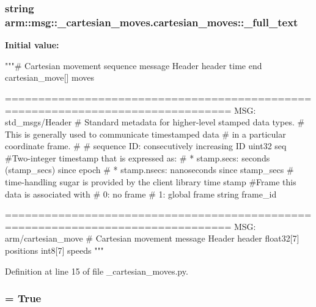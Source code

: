 \subsubsection[{\-\_\-full\-\_\-text}]{\setlength{\rightskip}{0pt plus 5cm}string {\bf arm\-::msg\-::\-\_\-cartesian\-\_\-moves.\-cartesian\-\_\-moves\-::\-\_\-full\-\_\-text}\hspace{0.3cm}{\ttfamily  [static, private]}}\label{classarm_1_1msg_1_1__cartesian__moves_1_1cartesian__moves_a37d112c5bd835b8555970e9e96efc03d}
{\bfseries \-Initial value\-:}
\begin{DoxyCode}
"""# Cartesian movement sequence message
Header header
time end
cartesian_move[] moves

      ================================================================================
MSG: std_msgs/Header
# Standard metadata for higher-level stamped data types.
# This is generally used to communicate timestamped data 
# in a particular coordinate frame.
# 
# sequence ID: consecutively increasing ID 
uint32 seq
#Two-integer timestamp that is expressed as:
# * stamp.secs: seconds (stamp_secs) since epoch
# * stamp.nsecs: nanoseconds since stamp_secs
# time-handling sugar is provided by the client library
time stamp
#Frame this data is associated with
# 0: no frame
# 1: global frame
string frame_id


      ================================================================================
MSG: arm/cartesian_move
# Cartesian movement message
Header header
float32[7] positions
int8[7] speeds
"""
\end{DoxyCode}


\-Definition at line 15 of file \-\_\-cartesian\-\_\-moves.\-py.

\subsubsection[{\-\_\-has\-\_\-header}]{ = \-True\hspace{0.3cm}{\ttfamily  [static, private]}}\label{classarm_1_1msg_1_1__cartesian__moves_1_1cartesian__moves_a93ee085ded9b2d8aeb0b78f1bf54e189}


